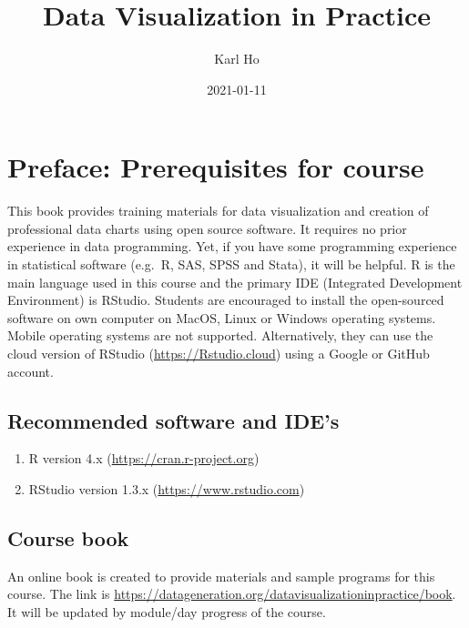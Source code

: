 \documentclass[
]{book}
\title{Data Visualization in Practice}
\author{Karl Ho}
\date{2021-01-11}
\providecommand{\tightlist}{%
  \setlength{\itemsep}{0pt}\setlength{\parskip}{0pt}}
\begin{document}
\maketitle

{
\setcounter{tocdepth}{1}
\tableofcontents
}
\hypertarget{preface-prerequisites-for-course}{%
\chapter*{Preface: Prerequisites for course}\label{preface-prerequisites-for-course}}

This book provides training materials for data visualization and creation of professional data charts using open source software. It requires no prior experience in data programming. Yet, if you have some programming experience in statistical software (e.g.~R, SAS, SPSS and Stata), it will be helpful. R is the main language used in this course and the primary IDE (Integrated Development Environment) is RStudio. Students are encouraged to install the open-sourced software on own computer on MacOS, Linux or Windows operating systems. Mobile operating systems are not supported. Alternatively, they can use the cloud version of RStudio (\url{https://Rstudio.cloud}) using a Google or GitHub account.

\hypertarget{recommended-software-and-ides}{%
\section{Recommended software and IDE's}\label{recommended-software-and-ides}}

\begin{enumerate}
\def\labelenumi{\arabic{enumi}.}
\tightlist
\item
  R version 4.x (\url{https://cran.r-project.org})
\item
  RStudio version 1.3.x (\url{https://www.rstudio.com})
\end{enumerate}

\hypertarget{course-book}{%
\section{Course book}\label{course-book}}

An online book is created to provide materials and sample programs for this course. The link is \url{https://datageneration.org/datavisualizationinpractice/book}. It will be updated by module/day progress of the course.
\end{document}
